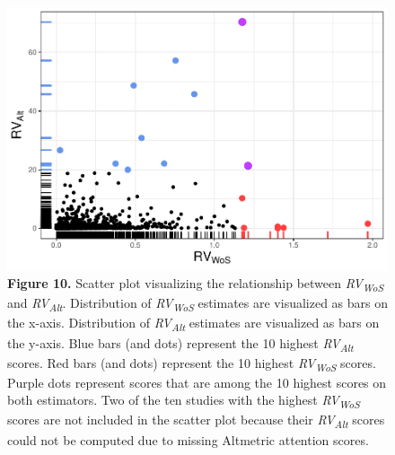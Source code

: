 \documentclass[
  english,
  man,floatsintext]{apa6}
\begin{document}
\begin{figure}
\centering
\includegraphics{RVcn_feasibility_in_social_neuroscience_files/figure-latex/fig10-1.pdf}
\caption{\label{fig:fig10}\textbf{Figure 10.} Scatter plot visualizing the relationship between \emph{RV\textsubscript{WoS}} and \emph{RV\textsubscript{Alt}}. Distribution of \emph{RV\textsubscript{WoS}} estimates are visualized as bars on the x-axis. Distribution of \emph{RV\textsubscript{Alt}} estimates are visualized as bars on the y-axis. Blue bars (and dots) represent the 10 highest \emph{RV\textsubscript{Alt}} scores. Red bars (and dots) represent the 10 highest \emph{RV\textsubscript{WoS}} scores. Purple dots represent scores that are among the 10 highest scores on both estimators. Two of the ten studies with the highest \emph{RV\textsubscript{WoS}} scores are not included in the scatter plot because their \emph{RV\textsubscript{Alt}} scores could not be computed due to missing Altmetric attention scores.}
\end{figure}
\end{document}
